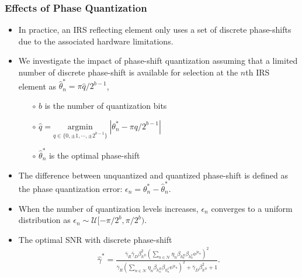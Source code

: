 \documentclass[article,mathserif,10pt,envcountsect]{beamer}
\renewcommand{\exp}[1]{\mathrm{e}^{#1}}
\begin{document}
\begin{frame}
	\frametitle{Effects of Phase Quantization}
	\begin{itemize}	
		\item In practice, an IRS reflecting element  only uses  a set of discrete phase-shifts due to the associated hardware limitations.
		
		\item We investigate the impact of phase-shift quantization assuming that a limited number of discrete phase-shift is available for selection at the $n$th IRS element as 
		$\hat{\theta}_n^* = \pi \hat{q}/2^{b-1}$,
		\begin{itemize}
			\item[$\circ$] $b$ is the number of quantization bits
			\item[$\circ$] $\hat{q} = \underset{q \in \{0, \pm 1, \cdots, \pm 2^{b-1}\}}{ \mathrm{argmin}} \;{|\theta_n^* - \pi q/2^{b-1}|}$
			\item[$\circ$] $\hat{\theta}_n^*$ is the optimal phase-shift
		\end{itemize}
		
		\item The difference between unquantized and quantized phase-shift is defined as the phase quantization error:	$\epsilon_n = \theta_n^* - \hat{\theta}_n^*$.
		
		\item When the number of quantization levels increases, $\epsilon_n$ converges to a uniform distribution as $ \epsilon_n \sim \mathcal{U} [-\pi/2^b, \pi/2^b)$.
		
		\item The optimal SNR  with discrete phase-shift
		\begin{eqnarray} \label{eqn:opt_SNR}
		\hat{\gamma}^*=\frac{\bar{\gamma}_R \bar{\gamma}_D   \beta_{h^D}^2  \left(\sum_{n \in \mathcal{N}} \eta_{n} \beta_{h_{n}^R}  \beta_{h_{n}^I} \exp{j\epsilon_n}\right)^2}{ \bar{\gamma}_R \left(\sum_{n \in \mathcal{N}} \eta_{n} \beta_{h_{n}^R}  \beta_{h_{n}^I} \exp{j\epsilon_n} \right)^2  + \bar{\gamma}_D \beta_{h^D}^2 +1 }. \nonumber
		\end{eqnarray}
	

	\end{itemize}
	
\end{frame}
\end{document}
